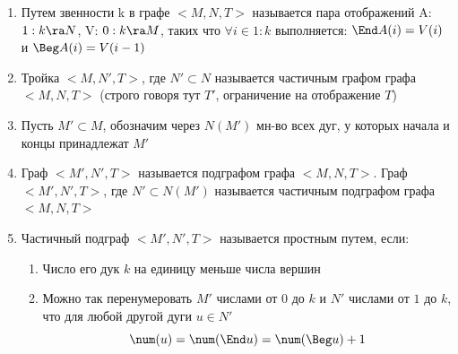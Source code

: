 \documentclass[discrete.tex]{subfiles}
\begin{document}
  \begin{definition}[по Романовскому]
    \begin{enumerate}
      \item Путем звенности k в графе $<M,N,T>$ называется пара отображений A: $1:k \ra N$, V: $0:k \ra M$, таких что $\forall i \in 1:k$ выполняется: $\End A(i)=V(i)$ и $\Beg A(i) = V(i-1)$
      \item Тройка $<M, N', T>$, где $N' \subset N$ называется частичным графом графа $<M,N,T>$ (строго говоря тут $T'$, ограничение на отображение $T$)
      \item Пусть $M' \subset M$, обозначим через $N(M')$ мн-во всех дуг, у которых начала и концы принадлежат $M'$
      \item Граф $<M', N', T>$ называется подграфом графа $<M,N,T>$. Граф $<M',N',T>$, где $N' \subset N(M')$ называется частичным подграфом графа $<M,N,T>$
      \item Частичный подграф $<M',N',T>$ называется простным путем, если:
      \begin{enumerate}
        \item Число его дук $k$ на единицу меньше числа вершин
        \item Можно так перенумеровать $M'$ числами от $0$ до $k$ и $N'$ числами от $1$ до $k$, что для любой другой дуги $u \in N'$
        \[\num(u) = \num (\End u) = \num(\Beg u) + 1\]


\end{enumerate}
\end{enumerate}
\end{definition}
\end{document}
